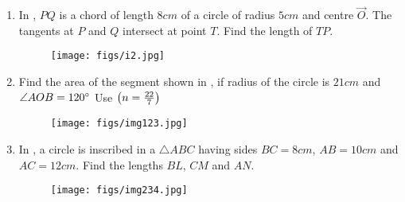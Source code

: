\begin{enumerate}
\item In , $PQ$ is a chord of length $8 cm$ of a circle of radius $5 cm$ and centre $\vec{O}$. The tangents at $P$ and $Q$ intersect at point $T$. Find the length of $TP$.
\begin{figure}[H]                                             \centering
         \texttt{[image: figs/i2.jpg]}
			\caption{}
			\label{fig:figure2}

                \end{figure}
\item Find the area of the segment shown in , if radius of the circle is $21 cm$ and $\angle AOB = 120\degree$ Use $\left(n =\frac{22}{7}\right) $
\begin{figure}[H]                                     
\centering
	
 \texttt{[image: figs/img123.jpg]}
		
\caption{}
		
\label{fig:figure5}
\end{figure}
\item In , a circle is inscribed in a $\triangle ABC$ having sides $BC=8 cm$, $AB = 10cm$ and $AC = 12 cm$. Find the lengths $BL$, $CM$ and $AN$.
                                         
\begin{figure}[H]                                     
\centering
\texttt{[image: figs/img234.jpg]}
\caption{}
\label{fig:figure6}

 \end{figure}
\end{enumerate}